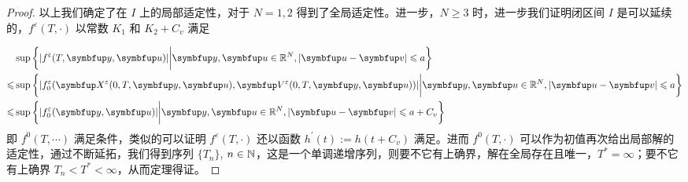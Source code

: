 \begin{proof}
以上我们确定了在 $I$ 上的局部适定性，对于 $N=1,2$ 得到了全局适定性。进一步，$N\geqslant 3$ 时，进一步我们证明闭区间 $I$ 是可以延续的，$f^{\varepsilon}\left(T, \cdot\right)$ 以常数 $K_{1}$ 和 $K_{2}+C_{v}$ 满足\supremumf 

$$
\begin{aligned}
    &\sup \left\{|f^\varepsilon(T,\vect{y}, \vect{u})| \bigg| \vect{y},\vect{u}\in \bbR^{N}, |\vect{u}-\vect{v}|\leqslant a  \right\} \\
\leqslant &\sup \left\{|f^\varepsilon_0(\vect{X}^\varepsilon(0, T,\vect{y}, \vect{u}), \vect{V}^\varepsilon(0, T,\vect{y}, \vect{u}))| \bigg| \vect{y},\vect{u}\in \bbR^{N}, |\vect{u}-\vect{v}|\leqslant a  \right\} \\
\leqslant &\sup \left\{|f^\varepsilon_0(\vect{y}, \vect{u})| \bigg| \vect{y},\vect{u}\in \bbR^{N}, |\vect{u}-\vect{v}|\leqslant a +C_v \right\} 
\end{aligned}
$$
即 $f^0(T,\cdots)$ 满足\supremumf 条件，类似的可以证明 $f^{\varepsilon}\left(T, \cdot\right)$ 还以函数 $h^\prime(t):= h(t+C_v) $ 满足\lipOffVsphere 。进而 $f^{0}\left(T, \cdot\right)$ 可以作为初值再次给出局部解的适定性，通过不断延拓，我们得到序列 $\{T_n\}$, $n\in {\mathbb{N}}$，这是一个单调递增序列，则要不它有上确界，解在全局存在且唯一，$T^*=\infty$；要不它有上确界 $T_n<T^*<\infty$，从而定理得证。







\end{proof}
